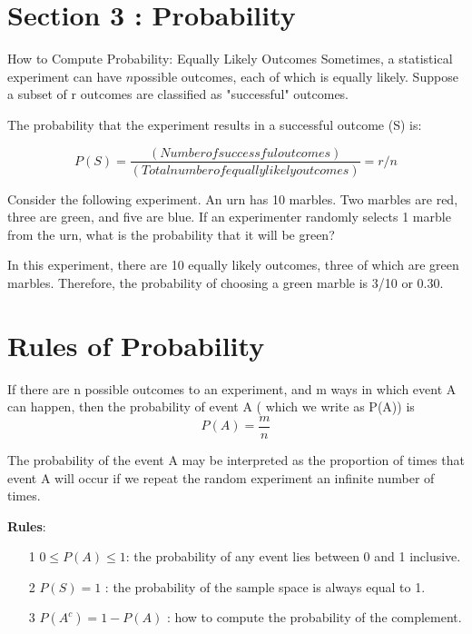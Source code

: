 \documentclass[]{report}
\begin{document}
{{{%







\section*{Section 3 : Probability}

How to Compute Probability: Equally Likely Outcomes
Sometimes, a statistical experiment can have $n $possible outcomes, each of which is equally likely. Suppose a subset of r outcomes are classified as "successful" outcomes.

The probability that the experiment results in a successful outcome (S) is:

\[ P(S) = \frac{ ( Number of successful outcomes ) }{ ( Total number of equally likely outcomes ) }= r / n\]

Consider the following experiment. An urn has 10 marbles. Two marbles are red, three are green, and five are blue. If an experimenter randomly selects 1 marble from the urn, what is the probability that it will be green?

In this experiment, there are 10 equally likely outcomes, three of which are green marbles. Therefore, the probability of choosing a green marble is 3/10 or 0.30.


{

{
\section{Rules of Probability}
If there are n possible outcomes to an experiment, and m ways in which event
A can happen, then the probability of event A ( which we write as P(A)) is
\[ P(A) = \frac{m}{n} \]

The probability of the event A may be interpreted as the proportion of times
that event A will occur if we repeat the random experiment an infinite number
of times.\\ \bigskip

\textbf{Rules}:\\
\begin{itemize}
\item[1] $0 \leq P(A) \leq 1 $: the probability of any event lies between 0 and 1
inclusive.
\item[2] $P(S) = 1$ : the probability of the sample space is always equal to 1.
\item[3] $P(A^c) = 1-P(A)$ : how to compute the probability of the complement.
\end{itemize}




}}}}}
\end{document}
